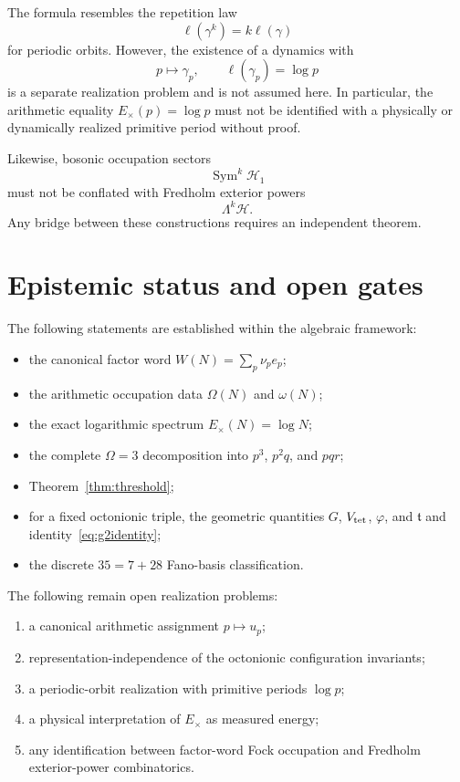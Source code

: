 \documentclass[11pt,a4paper]{article}
\theoremstyle{definition}
\theoremstyle{remark}
\newcommand{\Sym}{\operatorname{Sym}}
\begin{document}
The formula resembles the repetition law
\[
\ell(\gamma^k)=k\ell(\gamma)
\]
for periodic orbits. However, the existence of a dynamics with
\[
p\mapsto\gamma_p,\qquad \ell(\gamma_p)=\log p
\]
is a separate realization problem and is not assumed here. In particular, the arithmetic equality $E_\times(p)=\log p$ must not be identified with a physically or dynamically realized primitive period without proof.

Likewise, bosonic occupation sectors
\[
\Sym^k\mathcal H_1
\]
must not be conflated with Fredholm exterior powers
\[
\Lambda^k\mathcal H.
\]
Any bridge between these constructions requires an independent theorem.

\section{Epistemic status and open gates}
The following statements are established within the algebraic framework:
\begin{itemize}
\item the canonical factor word $W(N)=\sum_p\nu_pe_p$;
\item the arithmetic occupation data $\Omega(N)$ and $\omega(N)$;
\item the exact logarithmic spectrum $E_\times(N)=\log N$;
\item the complete $\Omega=3$ decomposition into $p^3$, $p^2q$, and $pqr$;
\item Theorem~\ref{thm:threshold};
\item for a fixed octonionic triple, the geometric quantities $G$, $V_{\rm tet}$, $\varphi$, and $\mathfrak t$ and identity~\eqref{eq:g2identity};
\item the discrete $35=7+28$ Fano-basis classification.
\end{itemize}

The following remain open realization problems:
\begin{enumerate}
\item a canonical arithmetic assignment $p\mapsto u_p$;
\item representation-independence of the octonionic configuration invariants;
\item a periodic-orbit realization with primitive periods $\log p$;
\item a physical interpretation of $E_\times$ as measured energy;
\item any identification between factor-word Fock occupation and Fredholm exterior-power combinatorics.
\end{enumerate}
\end{document}
